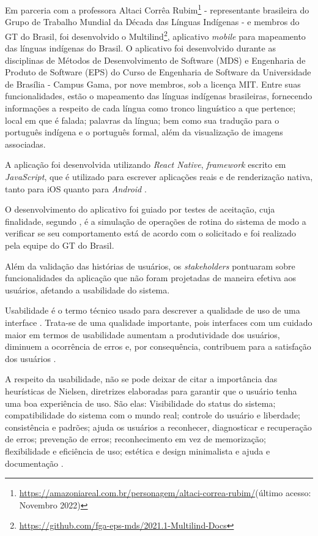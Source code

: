 Em parceria com a professora Altaci Corrêa Rubim\footnote{\url{https://amazoniareal.com.br/personagem/altaci-correa-rubim/}(último acesso: Novembro 2022)} - representante
brasileira do Grupo de Trabalho Mundial da Década das Línguas Indígenas - e membros do GT do Brasil, foi desenvolvido o
Multilind\footnote{\url{https://github.com/fga-eps-mds/2021.1-Multilind-Docs}}, aplicativo \textit{mobile} para mapeamento das línguas indígenas do Brasil. O aplicativo
foi desenvolvido durante as disciplinas de Métodos de Desenvolvimento de Software (MDS) e Engenharia de Produto de Software (EPS) do Curso de Engenharia de Software da
Universidade de Brasília - Campus Gama, por nove membros, sob a licença MIT. Entre suas funcionalidades, estão o mapeamento das línguas indígenas brasileiras, fornecendo
informações a respeito de cada língua como tronco linguístico a que pertence; local em que é falada; palavras da língua; bem como sua tradução para o português indígena e
o português formal, além da visualização de imagens associadas.

A aplicação foi desenvolvida utilizando \textit{React Native}, \textit{framework} escrito em \textit{JavaScript}, que é utilizado para escrever aplicações reais e de
renderização nativa, tanto para iOS quanto para \textit{Android} \cite{eiseman2017}.

O desenvolvimento do aplicativo foi guiado por testes de aceitação, cuja finalidade, segundo , é a simulação de operações de rotina do sistema de
modo a verificar se seu comportamento está de acordo com o solicitado e foi realizado pela equipe do GT do Brasil.

Além da validação das histórias de usuários, os \textit{stakeholders} pontuaram sobre funcionalidades da aplicação que não foram projetadas de maneira efetiva aos
usuários, afetando a usabilidade do sistema.

Usabilidade é o termo técnico usado para descrever a qualidade de uso de uma interface \cite{bevan1995}. Trata-se de uma qualidade importante, pois interfaces com um
cuidado maior em termos de usabilidade aumentam a produtividade dos usuários, diminuem a ocorrência de erros e, por consequência, contribuem para a satisfação dos
usuários \cite{winckler2022}.

A respeito da usabilidade, não se pode deixar de citar a importância das heurísticas de Nielsen, diretrizes elaboradas para garantir que o usuário tenha uma boa
experiência de uso. São elas: Visibilidade do status do sistema; compatibilidade do sistema com o mundo real; controle do usuário e liberdade; consistência e padrões;
ajuda os usuários a reconhecer, diagnosticar e recuperação de erros; prevenção de erros; reconhecimento em vez de memorização; flexibilidade e eficiência de uso; estética
e design minimalista e ajuda e documentação \cite{nielsen1994}.

